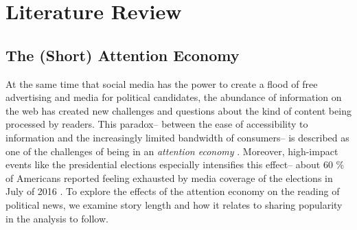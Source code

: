 \documentclass[letterpaper]{article}
\begin{document}
\section{Literature Review}

  
\subsection{The (Short) Attention Economy}
At the same time that social media has the power to create a flood of free advertising and media for political candidates, the abundance of information on the web has created new challenges and questions about the kind of content being processed by readers. This paradox-- between the ease of accessibility to information and the increasingly limited bandwidth of consumers-- is described as one of the challenges of being in an \emph{attention economy} \cite{goldhaber1997attention}. Moreover, high-impact events like the presidential elections especially intensifies this effect-- about 60 \% of Americans reported feeling exhausted by media coverage of the elections in July of 2016 \cite{election-fatigue}. To explore the effects of the attention economy on the reading of political news, we examine story length and how it relates to sharing popularity in the analysis to follow.
 
\end{document}

